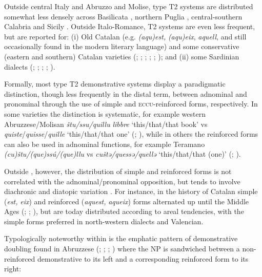 \documentclass[output=paper]{langsci/langscibook}
\begin{document}
Outside central Italy and Abruzzo and Molise, type T2 systems are distributed
somewhat less densely across Basilicata \citep[29]{Ludtke:1979a}, northern
Puglia \citep[27, 60]{Valente:1975a}, central-southern Calabria \citep[92 n.41,
107]{ledgeway2004sviluppo} and Sicily \citep[29, 41]{Leone:1995a}. Outside
Italo-Romance, T2 systems are even less frequent, but are reported for: (i) Old
Catalan (e.g. \emph{(aqu)est,} \emph{(aqu)eix}, \emph{aquell}, and still
occasionally found in the modern literary language) and some conservative
(eastern and southern) Catalan varieties
(\citealt[500f]{Badia-i-Margarit:1995a};
\citealt[81]{Duarte-i-Montserrat:1986a}; \citealt[256]{Veny:1991a};
\citealt[107]{Wheeler:1999a}; \citealt[179]{Moll:2006a};
\citealt[208f]{Nogue-Serrano:2015a}); and (ii) some Sardinian dialects
(\citealt[839]{Blasco-Ferrer:1988a}; \citealt[34, 203]{Jones:1993a};
\citealt[44]{Corda:1994a};
\citealt[§3.6]{Da-Milano:2007a}; \citealt[48]{Putzu:2015a}).

Formally, most  type T2 demonstrative systems display a
para\-digmatic distinction, though less frequently in the distal term, between
adnominal and pronominal  through the use of simple and
\textsc{eccu}-re\-in\-forced forms, respectively. In some varieties the
distinction is systematic, for example western Abruzzese/Molisan \emph{štu/ssu/quillu}
\emph{libbre} ‘this/that/that book’ vs
\emph{quis\-te}/\emph{quis\-se}/\emph{quil\-le} ‘this/that/that one’
(\citealt[22]{Finamore:1893a}; \citealt[647]{Marinucci:1988a}), while in others
the reinforced forms can also be used in adnominal functions, for example Teramano
\emph{(cu)štu/(que)ssú/(que)llu} vs \emph{cuštə/quessə/quellə} ‘this/that/that
(one)’ (\citealt[62]{Savini:1881a}; \citealt{Mantenuto:2016a}).

Outside , however, the distribution of simple and reinforced forms
is not correlated with the adnominal/pronominal opposition, but tends to
involve diachronic and diatopic variation
\citep[§§2.1.1--4]{Sornicola:2011a}. For instance, in the
history of Catalan simple (\emph{est,} \emph{eix}) and reinforced
(\emph{aquest,} \emph{aqueix}) forms alternated up until the Middle Ages
(\citealt[141]{Badia-i-Margarit:1991a};
\citealt[79f]{Duarte-i-Montserrat:1986a}; \citealt[179]{Moll:2006a}), but are
today distributed according to areal tendencies, with the simple forms
preferred in north-western dialects and Valencian.

Typologically noteworthy within  is the emphatic pattern of
demonstrative doubling found in Abruzzese (\citealt[62]{Savini:1881a};
\citealt[22]{Finamore:1893a}; \citealt[209]{Rohlfs:1968a};
\citealt[48f]{Verratti:1968a}) where the NP is sandwiched between a
non-rein\-forced demonstrative to its left and a corresponding reinforced form to
its right:
\end{document}
